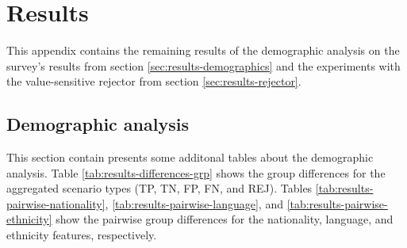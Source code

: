 \chapter{Results}
\label{sec:appendix-b}
This appendix contains the remaining results of the demographic analysis on the survey's results from section \ref{sec:results-demographics} and the experiments with the value-sensitive rejector from section \ref{sec:results-rejector}.

\section{Demographic analysis}
This section contain presents some additonal tables about the demographic analysis.
%
Table \ref{tab:results-differences-grp} shows the group differences for the aggregated scenario types (TP, TN, FP, FN, and REJ).
%
Tables \ref{tab:results-pairwise-nationality}, \ref{tab:results-pairwise-language}, and \ref{tab:results-pairwise-ethnicity} show the pairwise group differences for the nationality, language, and ethnicity features, respectively.

